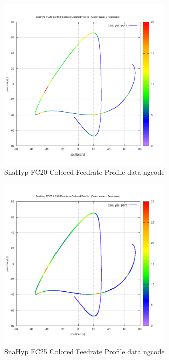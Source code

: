 \begin{figure}
	\caption     {SnaHyp FC20 Colored Feedrate Profile data ngcode}
	\label{18-img-SnaHyp-FC20-Colored-Feedrate-Profile-data_ngcode.png}
\includegraphics[width=0.75\textwidth]{Chap4/appendix/app-SnaHyp/plots/18-img-SnaHyp-FC20-Colored-Feedrate-Profile-data_ngcode.png}
\end{figure}

\clearpage
\pagebreak

\begin{figure}
	\caption     {SnaHyp FC25 Colored Feedrate Profile data ngcode}
	\label{19-img-SnaHyp-FC25-Colored-Feedrate-Profile-data_ngcode.png}
\includegraphics[width=0.75\textwidth]{Chap4/appendix/app-SnaHyp/plots/19-img-SnaHyp-FC25-Colored-Feedrate-Profile-data_ngcode.png}
\end{figure}


